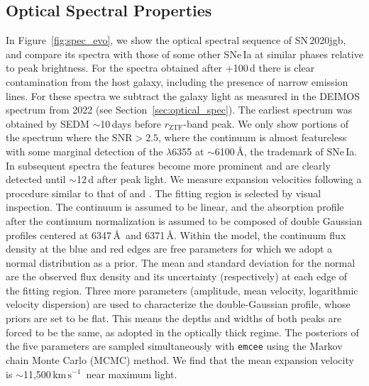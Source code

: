\documentclass[twocolumn]{aastex631}
\newcommand{\sn}{SN\,2020jgb}
\newcommand{\kms}{$\mathrm{km}\,\mathrm{s}^{-1}$}
\begin{document}
\subsection{Optical Spectral Properties}
In Figure~\ref{fig:spec_evo}, we show the optical spectral sequence of \sn, and compare its spectra with those of some other SNe\,Ia at similar phases relative to peak brightness. For the spectra obtained after +100\,d there is clear contamination from the host galaxy, including the presence of narrow emission lines. For these spectra we subtract the galaxy light as measured in the DEIMOS spectrum from 2022 (see Section~\ref{sec:optical_spec}). The earliest spectrum was obtained by SEDM $\sim$10\,days before $r_\mathrm{ZTF}$-band peak. We only show portions of the spectrum where the $\mathrm{SNR}>2.5$, where the continuum is almost featureless with some marginal detection of the  $\lambda$6355 at $\sim$6100\,\AA, the trademark of SNe\,Ia. In subsequent spectra the  features become more prominent and are clearly detected until $\sim$12\,d after peak light. We measure  expansion velocities following a procedure similar to that of  \citet{Childress_2013,Childress_2014} and \citet{Maguire_2014}. The fitting region is selected by visual inspection. The continuum is assumed to be linear, and the absorption profile after the continuum normalization is assumed to be composed of double Gaussian profiles centered at 6347\,\AA\ and 6371\,\AA. Within the model, the continuum flux density at the blue and red edges are free parameters for which we adopt a normal distribution as a prior. The mean and standard deviation for the normal are the observed flux density and its uncertainty (respectively) at each edge of the fitting region. Three more parameters (amplitude, mean velocity, logarithmic velocity dispersion) are used to characterize the double-Gaussian profile, whose priors are set to be flat. This means the depths and widths of both peaks are forced to be the same, as \citet{Maguire_2014} adopted in the optically thick regime. The posteriors of the five parameters are sampled simultaneously with \texttt{emcee} \citep{emcee_2013} using the Markov chain Monte Carlo (MCMC) method. We find that the mean expansion velocity is $\sim$11,500\,\kms\ near maximum light.
\end{document}
